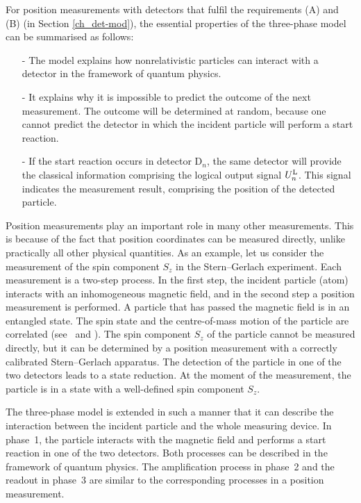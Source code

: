 \documentclass[12pt]{article}
\begin{document}
For position measurements with detectors that fulfil the requirements (A) and (B) (in Section \ref{ch_det-mod}), the essential properties of the three-phase model can be summarised as follows:  
%
\begin{itemize} 
\item[-] The model explains how nonrelativistic particles can interact with a detector in the framework of quantum physics.  
%
\item[-] It explains why it is impossible to predict the outcome of the next measurement.  The outcome will be determined at random, because one cannot predict the detector in which the incident particle will perform a start reaction.  
%
\item[-]  If the start reaction occurs in detector D$_n$, the same detector will provide the classical information comprising the logical output signal $U_n^{\rm L}$.  This signal indicates the measurement result, comprising the position of the detected particle. 
%
\end{itemize}

Position measurements play an important role in many other measurements.  
This is because of the fact that position coordinates can be measured directly, unlike practically all other physical quantities.  
As an example, let us consider the measurement of the spin component $S_z$ in the Stern--Gerlach experiment.  Each measurement is a two-step process.  
In the first step, the incident particle (atom) interacts with an inhomogeneous magnetic field, and in the second step a position measurement is performed.  
A particle that has passed the magnetic field is in an entangled state.  
The spin state and the centre-of-mass motion of the particle are correlated (see~\cite{Pa58} and \cite{GoYa}).  The spin component $S_z$ of the particle cannot be measured directly, but it can be determined by a position measurement with a correctly calibrated Stern--Gerlach apparatus.  
The detection of the particle in one of the two detectors leads to a state reduction.  At the moment of the measurement, the particle is in a state with a well-defined spin component $S_z$.  

The three-phase model is extended in such a manner that it can describe the interaction between the incident particle and the whole measuring device.  
In phase~1, the particle interacts with the magnetic field and performs a start reaction in one of the two detectors.  
Both processes can be described in the framework of quantum physics.  
The amplification process in phase~2 and the readout in phase~3 are similar to the corresponding processes in a position measurement.  
\end{document}
